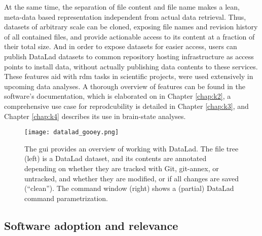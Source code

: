 {At the same time, the separation of file content and file name makes a lean, meta-data based representation independent from actual data retrieval.
Thus, datasets of arbitrary scale can be cloned, exposing file names and revision history of all contained files, and provide actionable access to its content at a fraction of their total size.
And in order to expose datasets for easier access, users can publish DataLad datasets to common repository hosting infrastructure as access points to install data, without actually publishing data contents to these services.
These features aid with \gls{rdm} tasks in scientific projects, were used extensively in upcoming data analyses.
A thorough overview of features can be found in the software's documentation, which is elaborated on in Chapter \ref{chap:k2},  a comprehensive use case for reprodcubility is detailed in Chapter \ref{chap:k3}, and Chapter \ref{chap:k4} describes its use in brain-state analyses.

\begin{figure}
	\centering
	\texttt{[image: datalad\_gooey.png]}
	\caption[DataLad's Graphical User Interface]{The \gls{gui} provides an overview of working with DataLad. The file tree (left) is a DataLad dataset, and its contents are annotated depending on whether they are tracked with Git, git-annex, or untracked, and whether they are modified, or if all changes are saved (``clean''). The command window (right) shows a (partial) DataLad command parametrization.}
	\label{fig:gooey}
\end{figure}

\subsection{Software adoption and relevance}

}
